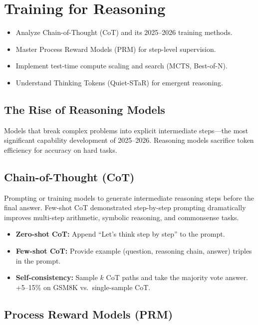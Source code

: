 \chapter{Training for Reasoning}
\minitoc

\begin{chapteroverview}
  \begin{itemize}
    \item Analyze Chain-of-Thought (CoT) and its 2025--2026 training methods.
    \item Master Process Reward Models (PRM) for step-level supervision.
    \item Implement test-time compute scaling and search (MCTS, Best-of-N).
    \item Understand Thinking Tokens (Quiet-STaR) for emergent reasoning.
  \end{itemize}
\end{chapteroverview}

\section{The Rise of Reasoning Models}

Models that break complex problems into explicit intermediate steps---the most significant capability development of 2025--2026. Reasoning models sacrifice token efficiency for accuracy on hard tasks.

\section{Chain-of-Thought (CoT)}

Prompting or training models to generate intermediate reasoning steps before the final answer. Few-shot CoT \parencite{wei2022chain} demonstrated step-by-step prompting dramatically improves multi-step arithmetic, symbolic reasoning, and commonsense tasks.

\begin{itemize}
  \item \textbf{Zero-shot CoT:} Append ``Let's think step by step'' to the prompt.
  \item \textbf{Few-shot CoT:} Provide example (question, reasoning chain, answer) triples in the prompt.
  \item \textbf{Self-consistency:} Sample $k$ CoT paths and take the majority vote answer. +5--15\% on GSM8K vs.\ single-sample CoT.
\end{itemize}

\section{Process Reward Models (PRM)}

